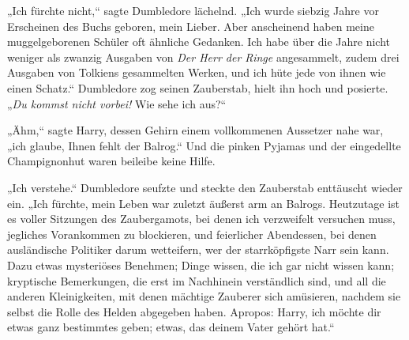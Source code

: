 „Ich fürchte nicht,“ sagte Dumbledore lächelnd. „Ich wurde siebzig Jahre vor Erscheinen des Buchs geboren, mein Lieber. Aber anscheinend haben meine muggelgeborenen Schüler oft ähnliche Gedanken. Ich habe über die Jahre nicht weniger als zwanzig Ausgaben von \emph{Der Herr der Ringe} angesammelt, zudem drei Ausgaben von Tolkiens gesammelten Werken, und ich hüte jede von ihnen wie einen Schatz.“ Dumbledore zog seinen Zauberstab, hielt ihn hoch und posierte. „\emph{Du kommst nicht vorbei!} Wie sehe ich aus?“

„Ähm,“ sagte Harry, dessen Gehirn einem vollkommenen Aussetzer nahe war, „ich glaube, Ihnen fehlt der Balrog.“ Und die pinken Pyjamas und der eingedellte Champignonhut waren beileibe keine Hilfe.

„Ich verstehe.“ Dumbledore seufzte und steckte den Zauberstab enttäuscht wieder ein. „Ich fürchte, mein Leben war zuletzt äußerst arm an Balrogs. Heutzutage ist es voller Sitzungen des Zaubergamots, bei denen ich verzweifelt versuchen muss, jegliches Vorankommen zu blockieren, und feierlicher Abendessen, bei denen ausländische Politiker darum wetteifern, wer der starrköpfigste Narr sein kann. Dazu etwas mysteriöses Benehmen; Dinge wissen, die ich gar nicht wissen kann; kryptische Bemerkungen, die erst im Nachhinein verständlich sind, und all die anderen Kleinigkeiten, mit denen mächtige Zauberer sich amüsieren, nachdem sie selbst die Rolle des Helden abgegeben haben. Apropos: Harry, ich möchte dir etwas ganz bestimmtes geben; etwas, das deinem Vater gehört hat.“

